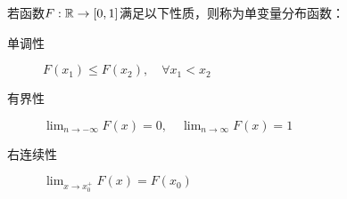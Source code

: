 \begin{definition}[单变量分布函数]
    若函数$F : \mathbb{R} \to [0,1] $满足以下性质，则称为单变量分布函数：
    \begin{description}
        \item[单调性] $F(x_1)\le F(x_2) , \quad \forall x_1<x_2$
        \item[有界性] $\lim_{n \to -\infty}F(x)=0, \quad \lim_{n \to \infty}F(x)=1$
        \item[右连续性] $\lim_{x \to x_0^+}F(x)=F(x_0)$
    \end{description}
\end{definition}


